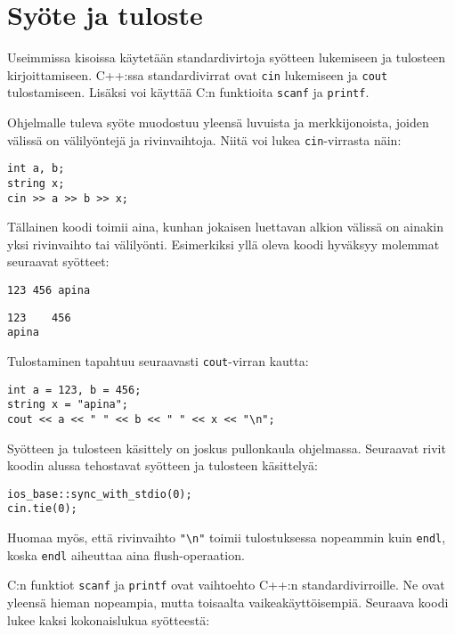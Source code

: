 \section{Syöte ja tuloste}


Useimmissa kisoissa käytetään
standardivirtoja syötteen lukemiseen ja tulosteen
kirjoittamiseen.
C++:ssa standardivirrat ovat \texttt{cin}
lukemiseen
ja \texttt{cout} tulostamiseen. Lisäksi voi käyttää
C:n funktioita \texttt{scanf} ja \texttt{printf}.

Ohjelmalle tuleva syöte muodostuu yleensä
luvuista ja merkkijonoista,
joiden välissä on välilyöntejä ja rivinvaihtoja.
Niitä voi lukea \texttt{cin}-virrasta näin:

\begin{lstlisting}
int a, b;
string x;
cin >> a >> b >> x;
\end{lstlisting}

Tällainen koodi toimii aina,
kunhan jokaisen luettavan alkion välissä
on ainakin yksi rivinvaihto tai välilyönti.
Esimerkiksi yllä oleva koodi hyväksyy
molemmat seuraavat syötteet:
\begin{lstlisting}
123 456 apina
\end{lstlisting}
\begin{lstlisting}
123    456
apina
\end{lstlisting}
Tulostaminen tapahtuu seuraavasti
\texttt{cout}-virran kautta:

\begin{lstlisting}
int a = 123, b = 456;
string x = "apina";
cout << a << " " << b << " " << x << "\n";
\end{lstlisting}

Syötteen ja tulosteen käsittely on joskus
pullonkaula ohjelmassa.
Seuraavat rivit koodin alussa tehostavat
syötteen ja tulosteen käsittelyä:

\begin{lstlisting}
ios_base::sync_with_stdio(0);
cin.tie(0);
\end{lstlisting}

Huomaa myös, että rivinvaihto \texttt{"\textbackslash n"}
toimii tulostuksessa nopeammin kuin \texttt{endl},
koska \texttt{endl} aiheuttaa
aina flush-operaation.

C:n funktiot \texttt{scanf}
ja \texttt{printf} ovat vaihtoehto
C++:n standardivirroille.
Ne ovat yleensä hieman nopeampia,
mutta toisaalta vaikeakäyttöisempiä.
Seuraava koodi lukee kaksi kokonaislukua syötteestä:

